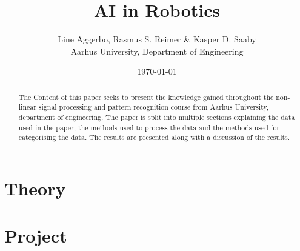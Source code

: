 

\title{
	\textbf{AI in Robotics}
}

\author{
	Line Aggerbo, Rasmus S. Reimer \& Kasper D. Saaby\\
	Aarhus University, Department of Engineering \\
}
\date{\today}




\maketitle


\begin{abstract}
The Content of this paper seeks to present the knowledge gained throughout the non-linear signal processing and pattern recognition course from Aarhus University, department of engineering. The paper is split into multiple sections explaining the data used in the paper, the methods used to process the data and the methods used for categorising the data. The results are presented along with a discussion of the results.
\end{abstract}


\chapter{Theory}








\chapter{Project}











